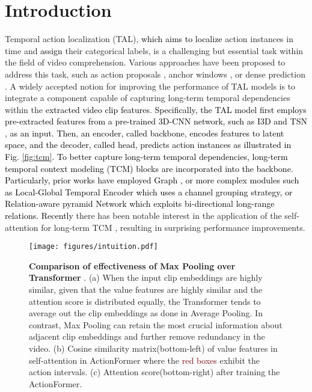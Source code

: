\documentclass[10pt,twocolumn,letterpaper]{article}
\newcommand{\ky}[1]{\textcolor{black}{{#1}}}
\newcommand{\tuan}[1]{\textcolor{black}{{#1}}}
\begin{document}
\section{Introduction}
Temporal action localization (TAL), \ky{which aims to localize} action instances in time and \ky{assign} their categorical labels, {is a challenging but essential task} within the field of video comprehension. 
Various approaches have been proposed to address this task, such as action proposals \cite{lin2019bmn},  anchor windows \cite{long2019gaussian}, or dense prediction \cite{lin2021learning}. A widely accepted notion for improving the performance of TAL models is to integrate a component capable of capturing long-term temporal dependencies within the \ky{extracted video clip features}\cite{qing2021temporal, gao2020accurate, zhang2022actionformer, he2022glformer, liu2022end, nawhal2021activity, tan2021relaxed, wang2021temporal}. 
\tuan{Specifically,} \ky{the TAL model first employs pre-extracted features from a pre-trained 3D-CNN network, such as I3D \cite{carreira2017quo} and TSN \cite{wang2016temporal}, as an input. Then, an encoder, called backbone, encodes features to latent space, and the decoder, called head, predicts action instances as illustrated in Fig. \ref{fig:tcm}. To better capture long-term temporal dependencies, long-term temporal context modeling (TCM) blocks are incorporated into the backbone. Particularly, prior works \cite{xu2020g, zhao2021video} have employed Graph \cite{kipf2016semi}, or more complex modules such as Local-Global Temporal Encoder \cite{qing2021temporal} which uses a channel grouping strategy, or Relation-aware pyramid Network \cite{gao2020accurate} which exploits bi-directional long-range relations.}
\ky{Recently} there has been notable interest in the application of the self-attention \cite{vaswani2017attention} for long-term TCM \cite{zhang2022actionformer, liu2022end, zhao2021actionness, kang2022htnet}, resulting in surprising performance improvements.

\begin{figure}[hbt!]
\begin{center}
\texttt{[image: figures/intuition.pdf]}
\end{center}
\caption{\textbf{Comparison of effectiveness of Max Pooling over Transformer} \cite{vaswani2017attention}. 
(a) When the input clip embeddings are highly similar, given that the value features  are highly similar and the attention score is distributed equally, the Transformer tends to average out the clip embeddings as done in Average Pooling. 
In contrast, Max Pooling can retain the most crucial information about adjacent clip embeddings and further remove redundancy in the video.
(b) Cosine similarity matrix(bottom-left) of value features in self-attention in ActionFormer \cite{zhang2022actionformer} where the \textcolor{darkred}{red boxes} exhibit the action intervals.
(c) Attention score(bottom-right) after training the ActionFormer\cite{zhang2022actionformer}. }
\label{fig:similarity}
\end{figure}
\end{document}
